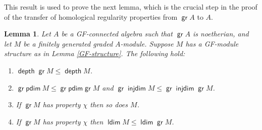 \documentclass[11pt,fleqn]{article}
\theoremstyle{plain}
\newtheorem{Lemma}[Theorem]{Lemma}
\theoremstyle{remark}
\theoremstyle{definition}
\newcommand\pdim{\mathsf{pdim}}
\DeclareMathOperator\gr{\mathsf{gr}}
\DeclareMathOperator\ldim{\mathsf{ldim}}
\DeclareMathOperator\injdim{\mathsf{injdim}}
\DeclareMathOperator\depth{\mathsf{depth}}
\begin{document}
This result is used to prove the next lemma, which is the crucial step in the proof of the
transfer of homological regularity properties from $\gr A$ to $A$. 
\begin{Lemma}
\label{varia-modules}
	Let $A$ be a GF-connected algebra such that $\gr A$ is noetherian, and let $M$ be
	a finitely generated graded $A$-module. Suppose $M$ has a GF-module structure as
	in Lemma \ref{GF-structure}. The following hold:
	\begin{enumerate}
		\item $\depth \gr M \leq \depth M$.
		\item $\gr\pdim~M \leq \gr\pdim \gr M$ and $\gr\injdim M \leq \gr\injdim
			\gr M$.	
		\item If $\gr M$ has property $\chi$ then so does $M$. 
		\item If $\gr M$ has property $\chi$ then $\ldim M \leq \ldim \gr M$. 
	\end{enumerate}
\end{Lemma}
\end{document}
